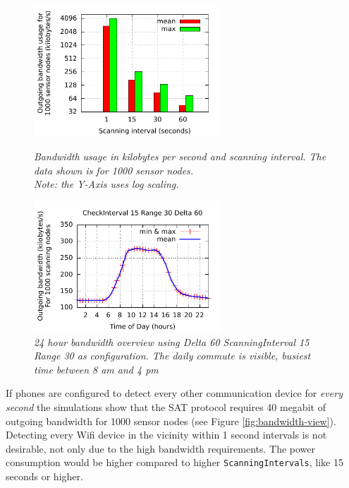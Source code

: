 \documentclass[10pt,titlepage]{article}
\begin{document}
\begin{figure}[ht]
\begin{minipage}[b]{0.45\linewidth}
\centering
\includegraphics[width=7cm]{scanninginterval-bandwidth-total.pdf}
\caption{\textit{Bandwidth usage in kilobytes per second and scanning interval. The data shown is for 1000 sensor nodes.\\Note: the Y-Axis uses log scaling.}}
\label{fig:bandwidth-view}
\end{minipage}
\hspace{0.5cm}
\begin{minipage}[b]{0.45\linewidth}
\centering
\includegraphics[width=7cm]{24-bandwidth-view.pdf}
\caption{\textit{24 hour bandwidth overview using Delta 60 ScanningInterval 15 Range 30 as configuration. The daily commute is visible, busiest time between 8 am and 4 pm}}
\label{fig:24h-bandwidth-view}

\end{minipage}
\end{figure}
\vspace{0.5cm}

If phones are configured to detect every other communication device for \textit{every second}
the simulations show that the SAT protocol requires 40 megabit of outgoing bandwidth for 1000 sensor nodes (see Figure \ref{fig:bandwidth-view}). Detecting every Wifi device in the vicinity within 1 second intervals is not desirable, not only due to the high bandwidth requirements. The power consumption would be higher compared to higher \texttt{ScanningIntervals}, like 15 seconds or higher.\\
\end{document}

